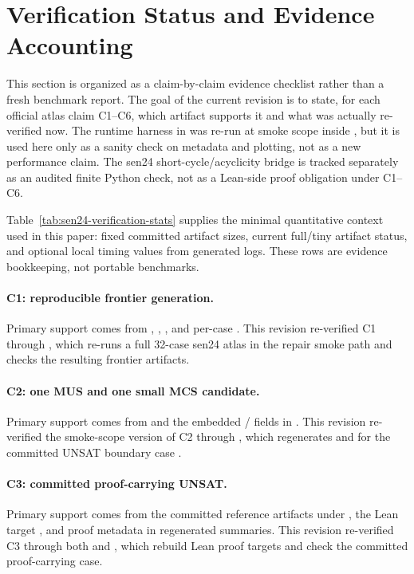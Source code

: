 \section{Verification Status and Evidence Accounting}

This section is organized as a claim-by-claim evidence checklist rather than a fresh benchmark report.
The goal of the current revision is to state, for each official atlas claim C1--C6, which artifact supports it and what was actually re-verified now.
The runtime harness in  was re-run at smoke scope inside , but it is used here only as a sanity check on metadata and plotting, not as a new performance claim.
The sen24 short-cycle/acyclicity bridge is tracked separately as an audited finite Python check, not as a Lean-side proof obligation under C1--C6.



Table~\ref{tab:sen24-verification-stats} supplies the minimal quantitative context used in this paper: fixed committed artifact sizes, current full/tiny artifact status, and optional local timing values from generated logs.
These rows are evidence bookkeeping, not portable benchmarks.

\paragraph{C1: reproducible frontier generation.}
Primary support comes from , , , and per-case .
This revision re-verified C1 through , which re-runs a full 32-case sen24 atlas in the repair smoke path and checks the resulting frontier artifacts.

\paragraph{C2: one MUS and one small MCS candidate.}
Primary support comes from  and the embedded / fields in .
This revision re-verified the smoke-scope version of C2 through , which regenerates  and  for the committed UNSAT boundary case .

\paragraph{C3: committed proof-carrying UNSAT.}
Primary support comes from the committed reference artifacts under , the Lean target , and proof metadata in regenerated summaries.
This revision re-verified C3 through both  and , which rebuild Lean proof targets and check the committed proof-carrying case.

